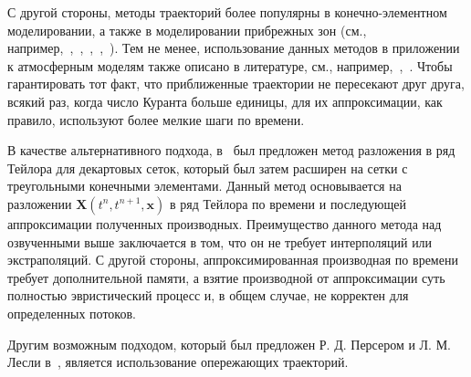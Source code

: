 С другой стороны, методы траекторий более популярны в конечно-элементном моделировании, а также в моделировании прибрежных зон (см., например,~\cite{A50},~\cite{A7},~\cite{A56},~\cite{A16},~\cite{A40}). Тем не менее, использование данных методов в приложении к атмосферным моделям также описано в литературе, см., например,~\cite{A6},~\cite{A22}. Чтобы гарантировать тот факт, что приближенные траектории не пересекают друг друга, всякий раз, когда число Куранта больше единицы, для их аппроксимации, как правило, используют более мелкие шаги по времени.

В качестве альтернативного подхода, в~\cite{A39} был предложен метод разложения в ряд Тейлора для декартовых сеток, который был затем расширен на сетки с треугольными конечными элементами. Данный метод основывается на разложении $\mathbf{X}(t^n,t^{n+1},\mathbf{x})$ в ряд Тейлора по времени и последующей аппроксимации полученных производных. Преимущество данного метода над озвученными выше заключается в том, что он не требует интерполяций или экстраполяций. С другой стороны, аппроксимированная производная по времени требует дополнительной памяти, а взятие производной от аппроксимации суть полностью эвристический процесс и, в общем случае, не корректен для определенных потоков.

Другим возможным подходом, который был предложен Р. Д. Персером и Л. М. Лесли в~\cite{A55}, является использование опережающих траекторий.
